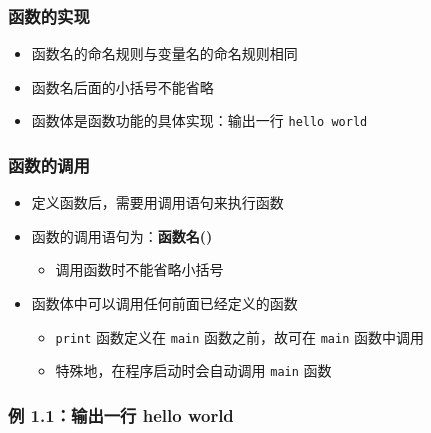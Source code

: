 \begin{frame}[fragile]
    \frametitle{函数的实现}

    \begin{itemize}[<+->]
        \item 函数名的命名规则与变量名的命名规则相同
        \item 函数名后面的小括号不能省略
        \item 函数体是函数功能的具体实现：输出一行 \lstinline|hello world|

        
    \end{itemize}
\end{frame}

\begin{frame}[fragile]
    \frametitle{函数的调用}

    \begin{itemize}[<+->]
        \item 定义函数后，需要用调用语句来执行函数
        \item 函数的调用语句为：\textbf{函数名()}
        \begin{itemize}
            \item 调用函数时不能省略小括号
        \end{itemize}

        \item 函数体中可以调用任何前面已经定义的函数
        \begin{itemize}
            \item \lstinline|print| 函数定义在 \lstinline|main| 函数之前，故可在 \lstinline|main| 函数中调用
            \item 特殊地，在程序启动时会自动调用 \lstinline|main| 函数
        \end{itemize}
    \end{itemize}
\end{frame}

\begin{frame}[fragile]
    \frametitle{例 1.1：输出一行 hello world}
    
    
\end{frame}

